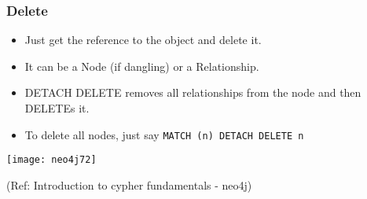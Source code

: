 \begin{frame}[fragile]\frametitle{Delete}

\begin{itemize}
\item Just get the reference to the object and delete it.
\item It can be a Node (if dangling) or a Relationship.
\item DETACH DELETE removes all relationships from the node and then DELETEs it.
\item To delete all nodes, just say \lstinline|MATCH (n) DETACH DELETE n|
\end{itemize}

\begin{center}
\texttt{[image: neo4j72]}
\end{center}	  


{\tiny (Ref: Introduction to cypher fundamentals  - neo4j)}
 

\end{frame}








